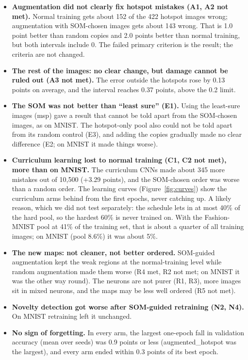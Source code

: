 \documentclass[11pt]{article}
\begin{document}
\begin{itemize}[leftmargin=1.4em, itemsep=2pt]
  \item \textbf{Augmentation did not clearly fix hotspot mistakes (A1, A2 not met).} Normal training gets about 152 of the 422 hotspot images wrong; augmentation with SOM-chosen images gets about 143 wrong. That is 1.0 point better than random copies and 2.0 points better than normal training, but both intervals include 0. The failed primary criterion is the result; the criteria are not changed.
  \item \textbf{The rest of the images: no clear change, but damage cannot be ruled out (A3 not met).} The error outside the hotspots rose by 0.13 points on average, and the interval reaches 0.37 points, above the 0.2 limit.
  \item \textbf{The SOM was not better than ``least sure'' (E1).} Using the least-sure images (msp) gave a result that cannot be told apart from the SOM-chosen images, as on MNIST. The hotspot-only pool also could not be told apart from its random control (E3), and adding the copies gradually made no clear difference (E2; on MNIST it made things worse).
  \item \textbf{Curriculum learning lost to normal training (C1, C2 not met), more than on MNIST.} The curriculum CNNs made about 345 more mistakes out of 10{,}500 (+3.29 points), and the SOM-chosen order was worse than a random order. The learning curves (Figure~\ref{fig:curves}) show the curriculum arms behind from the first epochs, never catching up. A likely reason, which we did not test separately: the schedule lets in at most 40\% of the hard pool, so the hardest 60\% is never trained on. With the Fashion-MNIST pool at 41\% of the training set, that is about a quarter of all training images; on MNIST (pool 8.6\%) it was about 5\%.
  \item \textbf{The new maps: not cleaner, not better ordered.} SOM-guided augmentation kept the weak regions at the normal-training level while random augmentation made them worse (R4 met, R2 not met; on MNIST it was the other way round). The neurons are not purer (R1, R3), more images sit in mixed neurons, and the maps may be less well ordered (R5 not met).
  \item \textbf{Novelty detection got worse after SOM-guided retraining (N2, N4).} On MNIST retraining left it unchanged.
  \item \textbf{No sign of forgetting.} In every arm, the largest one-epoch fall in validation accuracy (mean over seeds) was 0.9 points or less (augmented\_hotspot was the largest), and every arm ended within 0.3 points of its best epoch.
\end{itemize}
\end{document}
